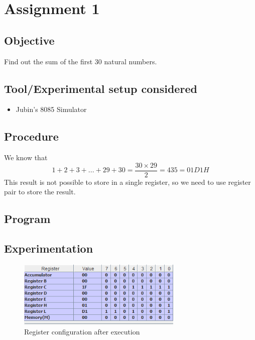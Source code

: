 \documentclass[a4paper]{article} %
\begin{document}

\setcounter{tocdepth}{1} %
\tableofcontents
\newpage
{}
\setcounter{page}{1}
\section[Find out the sum of the first 30 natural numbers]{Assignment 1} %
\subsection{Objective}
Find out the sum of the first 30 natural numbers.
\subsection{Tool/Experimental setup considered}
\begin{itemize}
    \item Jubin's 8085 Simulator
\end{itemize}
\subsection{Procedure}
We know that
\[1 + 2 + 3 + ... + 29 + 30 = \frac{30 \times 29}{2} = 435 =  01D1H\]
This result is not possible to store in a single register, so we need to use register pair to store the result.
\subsection{Program}


\subsection{Experimentation}
\begin{figure}[h!]
    \centering
    \includegraphics[width=0.7\textwidth]{Assignment 1/1_sum_till_30/registor.png}
    \caption{Register configuration after execution}
    \label{fg1}
\end{figure}
\end{document}
